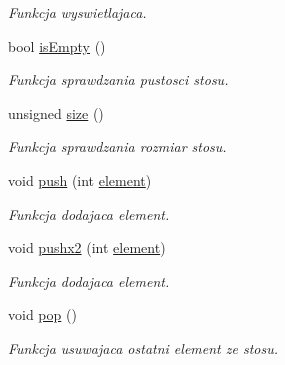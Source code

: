 \begin{DoxyCompactItemize}
\begin{DoxyCompactList}\small\item\em Funkcja wyswietlajaca. \end{DoxyCompactList}\item 
bool \hyperlink{classstos__tablica_a342d63c35ec388472893df57df246de8}{is\-Empty} ()
\begin{DoxyCompactList}\small\item\em Funkcja sprawdzania pustosci stosu. \end{DoxyCompactList}\item 
unsigned \hyperlink{classstos__tablica_a64607c240725db3cb6e860bdbb1a08b4}{size} ()
\begin{DoxyCompactList}\small\item\em Funkcja sprawdzania rozmiar stosu. \end{DoxyCompactList}\item 
void \hyperlink{classstos__tablica_ab338cc6c3811efb7204214bdd29c4b70}{push} (int \hyperlink{classelement}{element})
\begin{DoxyCompactList}\small\item\em Funkcja dodajaca element. \end{DoxyCompactList}\item 
void \hyperlink{classstos__tablica_aa20088e22fe2f0c6500029e72272f078}{pushx2} (int \hyperlink{classelement}{element})
\begin{DoxyCompactList}\small\item\em Funkcja dodajaca element. \end{DoxyCompactList}\item 
void \hyperlink{classstos__tablica_ace26a1b4508ebc5ae99ae0b3aed3f71a}{pop} ()
\begin{DoxyCompactList}\small\item\em Funkcja usuwajaca ostatni element ze stosu. \end{DoxyCompactList}\end{DoxyCompactItemize}
